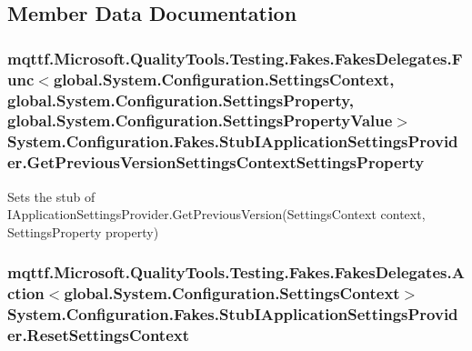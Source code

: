\subsection{Member Data Documentation}
\hypertarget{class_system_1_1_configuration_1_1_fakes_1_1_stub_i_application_settings_provider_a7a78d8d8704df1af01991eb40a30425b}{
\subsubsection[{Get\-Previous\-Version\-Settings\-Context\-Settings\-Property}]{\setlength{\rightskip}{0pt plus 5cm}mqttf.\-Microsoft.\-Quality\-Tools.\-Testing.\-Fakes.\-Fakes\-Delegates.\-Func$<$global.\-System.\-Configuration.\-Settings\-Context, global.\-System.\-Configuration.\-Settings\-Property, global.\-System.\-Configuration.\-Settings\-Property\-Value$>$ System.\-Configuration.\-Fakes.\-Stub\-I\-Application\-Settings\-Provider.\-Get\-Previous\-Version\-Settings\-Context\-Settings\-Property}}\label{class_system_1_1_configuration_1_1_fakes_1_1_stub_i_application_settings_provider_a7a78d8d8704df1af01991eb40a30425b}


Sets the stub of I\-Application\-Settings\-Provider.\-Get\-Previous\-Version(\-Settings\-Context context, Settings\-Property property)

\hypertarget{class_system_1_1_configuration_1_1_fakes_1_1_stub_i_application_settings_provider_a83db59848e7ec82cdedc16f9573b5255}{
\subsubsection[{Reset\-Settings\-Context}]{\setlength{\rightskip}{0pt plus 5cm}mqttf.\-Microsoft.\-Quality\-Tools.\-Testing.\-Fakes.\-Fakes\-Delegates.\-Action$<$global.\-System.\-Configuration.\-Settings\-Context$>$ System.\-Configuration.\-Fakes.\-Stub\-I\-Application\-Settings\-Provider.\-Reset\-Settings\-Context}}\label{class_system_1_1_configuration_1_1_fakes_1_1_stub_i_application_settings_provider_a83db59848e7ec82cdedc16f9573b5255}


